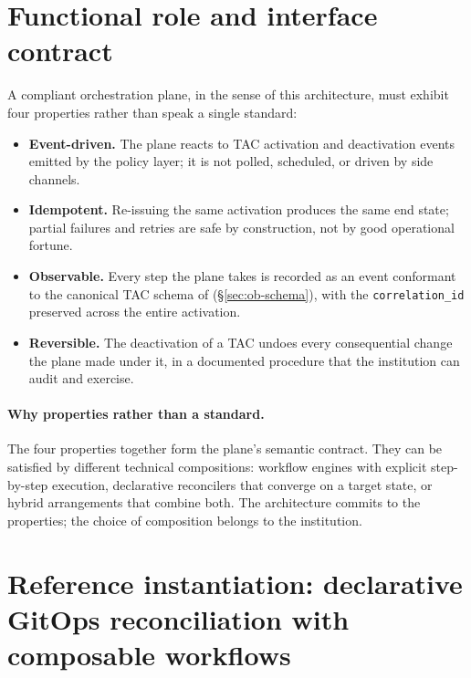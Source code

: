 \section{Functional role and interface contract}
\label{sec:or-contract}

\begin{contractbox}
\noindent A compliant orchestration plane, in the sense of this
architecture, must exhibit four properties rather than speak a
single standard:

\begin{itemize}[leftmargin=1.5em,nosep]
  \item \textbf{Event-driven.} The plane reacts to TAC activation
    and deactivation events emitted by the policy layer; it is not
    polled, scheduled, or driven by side channels.
  \item \textbf{Idempotent.} Re-issuing the same activation
    produces the same end state; partial failures and retries are
    safe by construction, not by good operational fortune.
  \item \textbf{Observable.} Every step the plane takes is recorded
    as an event conformant to the canonical TAC schema of
     (\S\ref{sec:ob-schema}), with the
    \texttt{correlation\_id} preserved across the entire activation.
  \item \textbf{Reversible.} The deactivation of a TAC undoes
    every consequential change the plane made under it, in a
    documented procedure that the institution can audit and exercise.
\end{itemize}
\end{contractbox}

\paragraph{Why properties rather than a standard.} The four
properties together form the plane's semantic contract. They can
be satisfied by different technical compositions: workflow engines
with explicit step-by-step execution, declarative reconcilers that
converge on a target state, or hybrid arrangements that combine
both. The architecture commits to the properties; the choice of
composition belongs to the institution.

\section{Reference instantiation: declarative GitOps reconciliation with composable workflows}
\label{sec:or-reference}

